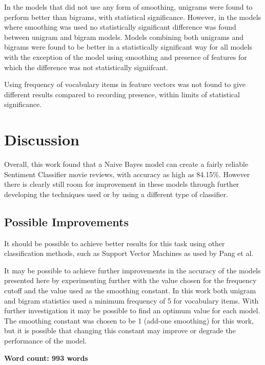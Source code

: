 \documentclass[twocolumn]{article}
\begin{document}
In the models that did not use any form of smoothing, unigrams were found to perform better than bigrams, with statistical significance. However, in the models where smoothing was used no statistically significant difference was found between unigram and bigram models. Models combining both unigrams and bigrams were found to be better in a statistically significant way for all models with the exception of the model using smoothing and presence of features for which the difference was not statistically signiifcant.

Using frequency of vocabulary items in feature vectors was not found to give different results compared to recording presence, within limits of statistical significance.

\section{Discussion}

Overall, this work found that a Naive Bayes model can create a fairly reliable Sentiment Classifier movie reviews, with accuracy as high as 84.15\%. However there is clearly still room for improvement in these models through further developing the techniques used or by using a different type of classifier.

\subsection{Possible Improvements}

It should be possible to achieve better results for this task using other classification methods, such as Support Vector Machines as used by Pang et al. 

It may be possible to achieve further improvements in the accuracy of the models presented here by experimenting further with the value chosen for the frequency cutoff and the value used as the smoothing constant. In this work both unigram and bigram statistics used a minimum frequency of 5 for vocabulary items. With further investigation it may be possible to find an optimum value for each model. The smoothing constant was chosen to be 1 (add-one smoothing) for this work, but it is possible that changing this constant may improve or degrade the performance of the model.





\textbf{Word count: 993 words}

{}

\end{document}
